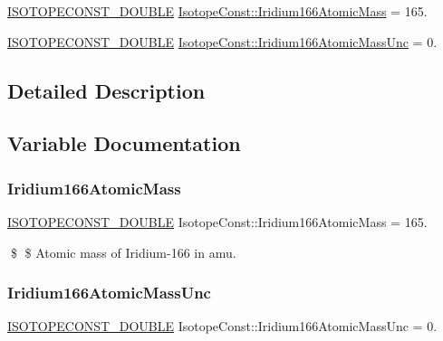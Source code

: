 \begin{DoxyCompactItemize}
\item 
\mbox{\hyperlink{group___isotope_const-_macros_ga8f45a7272ce02c0b4c65c44636ed719a}{I\+S\+O\+T\+O\+P\+E\+C\+O\+N\+S\+T\+\_\+\+D\+O\+U\+B\+LE}} \mbox{\hyperlink{group___isotope_const-_iridium-_ir166_ga7c8d5a7eca3a88b46b0f35411c8439a3}{Isotope\+Const\+::\+Iridium166\+Atomic\+Mass}} = 165.
\item 
\mbox{\hyperlink{group___isotope_const-_macros_ga8f45a7272ce02c0b4c65c44636ed719a}{I\+S\+O\+T\+O\+P\+E\+C\+O\+N\+S\+T\+\_\+\+D\+O\+U\+B\+LE}} \mbox{\hyperlink{group___isotope_const-_iridium-_ir166_ga169067dda81c957f620e0e143587bae2}{Isotope\+Const\+::\+Iridium166\+Atomic\+Mass\+Unc}} = 0.
\end{DoxyCompactItemize}


\subsection{Detailed Description}


\subsection{Variable Documentation}
\mbox{\label{group___isotope_const-_iridium-_ir166_ga7c8d5a7eca3a88b46b0f35411c8439a3}} 
\subsubsection{\texorpdfstring{Iridium166\+Atomic\+Mass}{Iridium166AtomicMass}}
{\footnotesize\ttfamily \mbox{\hyperlink{group___isotope_const-_macros_ga8f45a7272ce02c0b4c65c44636ed719a}{I\+S\+O\+T\+O\+P\+E\+C\+O\+N\+S\+T\+\_\+\+D\+O\+U\+B\+LE}} Isotope\+Const\+::\+Iridium166\+Atomic\+Mass = 165.}

\$ \$ Atomic mass of Iridium-\/166 in amu. \mbox{\label{group___isotope_const-_iridium-_ir166_ga169067dda81c957f620e0e143587bae2}} 
\subsubsection{\texorpdfstring{Iridium166\+Atomic\+Mass\+Unc}{Iridium166AtomicMassUnc}}
{\footnotesize\ttfamily \mbox{\hyperlink{group___isotope_const-_macros_ga8f45a7272ce02c0b4c65c44636ed719a}{I\+S\+O\+T\+O\+P\+E\+C\+O\+N\+S\+T\+\_\+\+D\+O\+U\+B\+LE}} Isotope\+Const\+::\+Iridium166\+Atomic\+Mass\+Unc = 0.}

